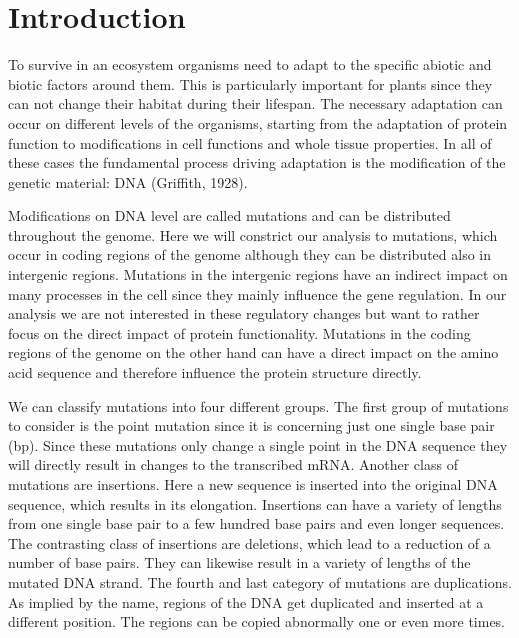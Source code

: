 \chapter{Introduction}
To survive in an ecosystem organisms need to adapt to the specific abiotic and biotic factors around them. This is particularly important for plants since they can not change their habitat during their lifespan. The necessary adaptation can occur on different levels of the organisms, starting from the adaptation of protein function to modifications in cell functions and whole tissue properties. In all of these cases the fundamental process driving adaptation is the modification of the genetic material: DNA (Griffith, 1928\cite{Griffith1928}).

Modifications on DNA level are called mutations and can be distributed throughout the genome. Here we will constrict our analysis to mutations, which occur in coding regions of the genome although they can be distributed also in intergenic regions. Mutations in the intergenic regions have an indirect impact on many processes in the cell since they mainly influence the gene regulation. In our analysis we are not interested in these regulatory changes but want to rather focus on the direct impact of protein functionality. Mutations in the coding regions of the genome on the other hand can have a direct impact on the amino acid sequence and therefore influence the protein structure directly. 

We can classify mutations into four different groups. The first group of mutations to consider is the point mutation since it is concerning just one single base pair (bp). Since these mutations only change a single point in the DNA sequence they will directly result in changes to the transcribed mRNA. Another class of mutations are insertions. Here a new sequence is inserted into the original DNA sequence, which results in its elongation. Insertions can have a variety of lengths from one single base pair to a few hundred base pairs and even longer sequences. The contrasting class of insertions are deletions, which lead to a reduction of a number of base pairs. They can likewise result in a variety of lengths of the mutated DNA strand. The fourth and last category of mutations are duplications. As implied by the name, regions of the DNA get duplicated and inserted at a different position. The regions can be copied abnormally one or even more times.

